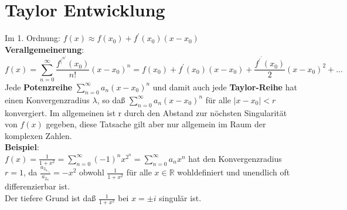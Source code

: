 \documentclass[11pt]{article}
\newcommand{\R}{\mathbb{R}}
\begin{document}
\section{Taylor Entwicklung}
	Im 1. Ordnung: $f(x) \approx f(x_0) + f^\prime(x_0)(x-x_0)$\\
\textbf{Verallgemeinerung}:\
	\[ f(x)= \sum_{n=0}^{\infty}\frac{f^(^n^) (x_0)}{n!} (x-x_0)^n = f(x_0) + f^\prime (x_0) (x - x_0) + \frac{f^\prime ^\prime (x_0)}{2} (x-x_0)^2 + ... \]
	Jede \textbf{Potenzreihe} $\sum_{n=0}^{\infty}a_n(x-x_0)^n$ und damit auch jede \textbf{Taylor-Reihe} hat einen Konvergenzradius $\lambda$, so daß $\sum_{n=0}^{\infty}a_n(x-x_0)^n$ für alle $|x-x_0| < r$ konvergiert. Im allgemeinen ist r durch den Abstand zur nöchsten Singularität von $f(x)$ gegeben, diese Tatsache gilt aber nur allgemein im Raum der komplexen Zahlen.\\
	\textbf{Beispiel}:\\ 
	$f(x) = \frac{1}{1 + x^2} = \sum_{n=0}^{\infty} (-1)^n x^2^n = \sum_{n=0}^{\infty} a_nx^n $ hat den Konvergenzradius $r = 1$, da $\frac{a_2_n_+_2}{a_2_n} = -x^2$ obwohl $\frac{1}{1+x^2}$ für alle $x \in \R$ wohldefiniert und unendlich oft differenzierbar ist. \\
	Der tiefere Grund ist daß $ \frac{1 }{1 + x^2} $ bei $x = \pm i$ singulär ist. 
\end{document}
